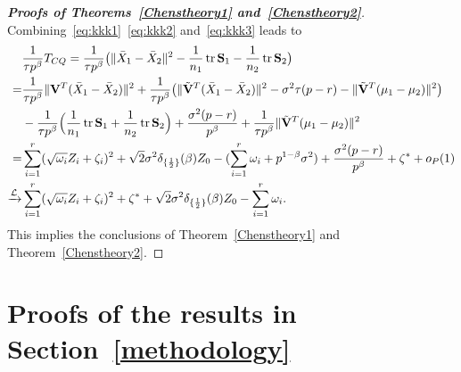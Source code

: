 \documentclass[3p]{elsarticle}
\DeclareMathOperator{\mytr}{tr}
\theoremstyle{plain}
\theoremstyle{definition}
\theoremstyle{remark}
\begin{document}
\begin{appendices}
\begin{proof}[\textbf{Proofs of Theorems~\ref{Chenstheory1} and~\ref{Chenstheory2}}]
    Combining~\eqref{eq:kkk1}~\eqref{eq:kkk2} and~\eqref{eq:kkk3} leads to
    $$
    \begin{aligned}
        &\frac{1}{\tau p^{\beta}} T_{CQ}
        =\frac{1}{\tau p^{\beta}}\big(\|\bar{X}_1-\bar{X}_2\|^2-\frac{1}{n_1}\mytr \BS_1-\frac{1}{n_2}\mytr \BS_2\big)\\
        =&
        \frac{1}{\tau p^{\beta}}{\|\BV^T(\bar{X}_1-\bar{X}_2)\|^2}+
        \frac{1}{\tau p^{\beta}} \big({\|\tilde{\BV}^T(\bar{X}_1-\bar{X}_2)\|^2-\sigma^2 \tau(p-r)-\|\tilde{\BV}^T(\mu_1-\mu_2)\|^2}\big)\\
        &-\frac{1}{\tau p^{\beta}}\Big(\frac{1}{n_1}\mytr \BS_1+\frac{1}{n_2}\mytr \BS_2\Big)+\frac{\sigma^2 (p-r)}{p^\beta}+\frac{1}{\tau p^\beta}\|\tilde{\BV}^T(\mu_1-\mu_2)\|^2\\
        =&
        \sum_{i=1}^r (\sqrt{\omega_i} Z_i+\zeta_i)^2+
   \sqrt{2} \sigma^2 \delta_{\{\frac{1}{2}\}}(\beta)Z_0
        -
        (\sum_{i=1}^r \omega_i+p^{1-\beta}\sigma^2)
        +\frac{\sigma^2 (p-r)}{p^\beta}+\zeta^*+o_P(1)\\
        \xrightarrow{\mathcal{L}}&
        \sum_{i=1}^r (\sqrt{\omega_i} Z_i+\zeta_i)^2+
\zeta^*+
    \sqrt{2}\sigma^2 \delta_{\{\frac{1}{2}\}}(\beta)Z_0
        -
        \sum_{i=1}^r \omega_i.
    \end{aligned}
    $$
    This implies the conclusions of Theorem~\ref{Chenstheory1} and Theorem~\ref{Chenstheory2}.

%

\end{proof}

\section{Proofs of the results in Section~\ref{methodology}}\label{appendixB}


\end{appendices}
\end{document}
